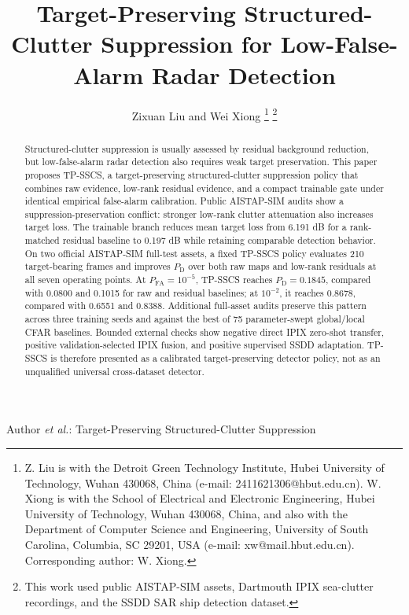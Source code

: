 \documentclass[journal]{IEEEtran}
\begin{document}
\title{Target-Preserving Structured-Clutter Suppression for Low-False-Alarm Radar Detection}

\author{Zixuan Liu and Wei Xiong%
\thanks{Z. Liu is with the Detroit Green Technology Institute, Hubei University of Technology, Wuhan 430068, China (e-mail: 2411621306@hbut.edu.cn). W. Xiong is with the School of Electrical and Electronic Engineering, Hubei University of Technology, Wuhan 430068, China, and also with the Department of Computer Science and Engineering, University of South Carolina, Columbia, SC 29201, USA (e-mail: xw@mail.hbut.edu.cn). Corresponding author: W. Xiong.}%
\thanks{This work used public AISTAP-SIM assets, Dartmouth IPIX sea-clutter recordings, and the SSDD SAR ship detection dataset.}}

%
{Author \MakeLowercase{\textit{et al.}}: Target-Preserving Structured-Clutter Suppression}

\maketitle

\begin{abstract}
Structured-clutter suppression is usually assessed by residual background reduction, but low-false-alarm radar detection also requires weak target preservation. This paper proposes TP-SSCS, a target-preserving structured-clutter suppression policy that combines raw evidence, low-rank residual evidence, and a compact trainable gate under identical empirical false-alarm calibration. Public AISTAP-SIM audits show a suppression-preservation conflict: stronger low-rank clutter attenuation also increases target loss. The trainable branch reduces mean target loss from 6.191 dB for a rank-matched residual baseline to 0.197 dB while retaining comparable detection behavior. On two official AISTAP-SIM full-test assets, a fixed TP-SSCS policy evaluates 210 target-bearing frames and improves $P_{\mathrm{D}}$ over both raw maps and low-rank residuals at all seven operating points. At $P_{\mathrm{FA}}=10^{-5}$, TP-SSCS reaches $P_{\mathrm{D}}=0.1845$, compared with 0.0800 and 0.1015 for raw and residual baselines; at $10^{-2}$, it reaches 0.8678, compared with 0.6551 and 0.8388. Additional full-asset audits preserve this pattern across three training seeds and against the best of 75 parameter-swept global/local CFAR baselines. Bounded external checks show negative direct IPIX zero-shot transfer, positive validation-selected IPIX fusion, and positive supervised SSDD adaptation. TP-SSCS is therefore presented as a calibrated target-preserving detector policy, not as an unqualified universal cross-dataset detector.
\end{abstract}
\end{document}
